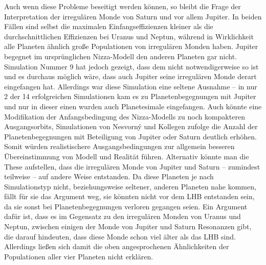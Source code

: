 \documentclass[12pt,a4paper,twoside]{article}
\begin{document}
Auch wenn diese Probleme beseitigt werden können, so bleibt die Frage der Interpretation der irregulären Monde von Saturn und vor allem Jupiter. In beiden Fällen sind selbst die maximalen Einfangseffizienzen kleiner als die durchschnittlichen Effizienzen bei Uranus und Neptun, %
während in Wirklichkeit alle Planeten ähnlich große Populationen von irregulären Monden haben\cite{Nesvorny2007}. %
Jupiter begegnet im ursprünglichen Nizza-Modell den anderen Planeten gar nicht.
Simulation Nummer 9 hat jedoch gezeigt, dass dem nicht notwendigerweise so ist und es durchaus möglich wäre, dass auch Jupiter seine irregulären Monde derart eingefangen hat.
Allerdings war diese Simulation eine seltene Ausnahme – in nur 2 der 14 erfolgreichen Simulationen kam es zu Planetenbegegnungen mit Jupiter und nur in dieser einen wurden auch Planetesimale eingefangen.
Auch könnte %
eine Modifikation der Anfangsbedingung des Nizza-Modells zu noch kompakteren Ausgangsorbits, Simulationen von Nesvorný und Kollegen zufolge die Anzahl der Planetenbegegnungen mit Beteiligung von Jupiter oder Saturn deutlich erhöhen\cite{Nesvorny2007}.
Somit würden realistischere Ausgangsbedingungen zur allgemein besseren Übereinstimmung von Modell und Realität führen. %
Alternativ könnte man die These aufstellen, dass die irregulären Monde von Jupiter und Saturn – zumindest teilweise – auf andere Weise entstanden. Da diese Planeten je nach Simulationstyp nicht, beziehungsweise seltener, anderen Planeten nahe kommen, fällt für sie das Argument weg, sie könnten nicht vor dem LHB entstanden sein, da sie sonst bei Planetenbegegnungen verloren gegangen seien.
Ein Argument dafür ist, dass es im Gegensatz zu den irregulären Monden von Uranus und Neptun, zwischen einigen der Monde von Jupiter und Saturn Resonanzen gibt, die darauf hindeuten, dass diese Monde schon viel älter als das LHB sind\cite{Beauge2007,Nesvorny2007}.
Allerdings ließen sich damit die oben angesprochenen Ähnlichkeiten der Populationen aller vier Planeten nicht erklären.


\FloatBarrier
\end{document}
